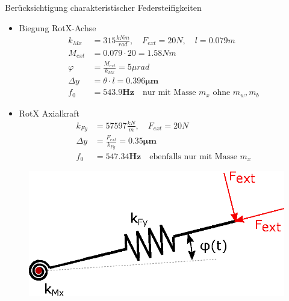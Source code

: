 \documentclass[10pt,xcolor=dvipsnames]{beamer}
\begin{document}
		\begin{frame}{\small Berücksichtigung charakteristischer Federsteifigkeiten}
		\begin{minipage}{0.7\textwidth}
			\begin{itemize}
				\item Biegung RotX-Achse
				\begin{align*}
				k_{Mx} &= 315\frac{kNm}{rad}, \quad F_{ext}=20N, \quad l=0.079m\\
				M_{ext} &= 0.079\cdot20 = 1.58Nm\\
				\varphi &= \frac{M_{ext}}{k_{Mx}} = 5\mu rad\\
				\Delta y &= \theta\cdot l=\bm{0.396\mu m}\\
				f_{0} &= \bm{543.9 Hz} \quad \text{nur mit Masse } m_{x} \text{ ohne } m_{w}, m_{b}  
				\end{align*}
				\item RotX Axialkraft
				\begin{align*}
				k_{Fy} &= 57597\frac{kN}{m}, \quad F_{ext}=20N\\
				\Delta y &= \frac{F_{ext}}{k_{Fy}} = \bm{0.35\mu m}\\
				f_{0} &= \bm{547.34 Hz} \quad \text{ebenfalls nur mit Masse } m_{x}  
				\end{align*}
			\end{itemize}
		\end{minipage}
		\hfill
		\begin{minipage}{0.28\textwidth}
			\begin{figure}[t]
				\includegraphics[width=1\linewidth]{./pics/rotX.eps}
			\end{figure}
		\end{minipage}
		\end{frame}
\end{document}

